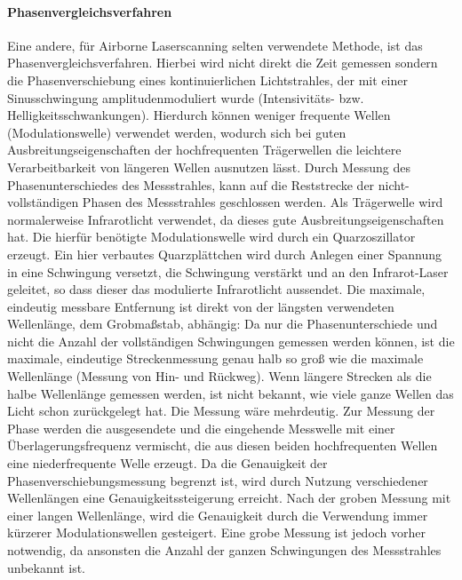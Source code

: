 \documentclass[a4paper,12pt,bibliography=totoc, listof=totoc,titlepage,pointlessnumbers]{scrreprt}
\begin{document}
\paragraph{Phasenvergleichsverfahren}
Eine andere, für Airborne Laser\-scan\-ning selten verwendete Methode, ist das Phasenvergleichsverfahren. Hierbei wird nicht direkt die Zeit gemessen sondern die Phasenverschiebung eines kontinuierlichen Lichtstrahles, der mit einer Sinusschwingung amplitudenmoduliert wurde (Intensivitäts- bzw. Helligkeitsschwankungen). Hierdurch können weniger frequente Wellen (Modulationswelle) verwendet werden, wodurch sich bei guten Ausbreitungseigenschaften der hochfrequenten Trägerwellen die leichtere Verarbeitbarkeit von längeren Wellen ausnutzen lässt. Durch Messung des Phasenunterschiedes des Messstrahles, kann auf die Reststrecke der nicht-vollständigen Phasen des Messstrahles geschlossen werden. Als Trägerwelle wird normalerweise Infrarotlicht verwendet, da dieses gute Ausbreitungseigenschaften hat. Die hierfür benötigte Modulationswelle wird durch ein Quarzoszillator erzeugt. Ein hier verbautes Quarzplättchen wird durch Anlegen einer Spannung in eine Schwingung versetzt, die Schwingung verstärkt und an den Infrarot-Laser geleitet, so dass dieser das modulierte Infrarotlicht aussendet. Die maximale, eindeutig messbare Entfernung ist direkt von der längsten verwendeten Wellenlänge, dem Grobmaßstab, abhängig: Da nur die Phasenunterschiede und nicht die Anzahl der vollständigen Schwingungen gemessen werden können, ist die maximale, eindeutige Streckenmessung genau halb so groß wie die maximale Wellenlänge (Messung von Hin- und Rückweg). Wenn längere Strecken als die halbe Wellenlänge gemessen werden, ist nicht bekannt, wie viele ganze Wellen das Licht schon zurückgelegt hat. Die Messung wäre mehrdeutig. Zur Messung der Phase werden die ausgesendete und die eingehende Messwelle mit einer Überlagerungsfrequenz vermischt, die aus diesen beiden hochfrequenten Wellen eine niederfrequente Welle erzeugt. Da die Genauigkeit der Phasenverschiebungsmessung begrenzt ist, wird durch Nutzung verschiedener Wellenlängen eine Genauigkeitssteigerung erreicht. Nach der groben Messung mit einer langen Wellenlänge, wird die Genauigkeit durch die Verwendung immer kürzerer Modulationswellen gesteigert. Eine grobe Messung ist jedoch vorher notwendig, da ansonsten die Anzahl der ganzen Schwingungen des Messstrahles unbekannt ist. \citep[S. 311ff]{Witte2006}
\end{document}
